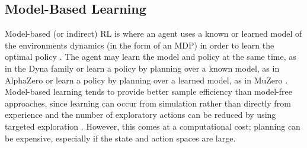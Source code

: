\subsection{Model-Based Learning}
Model-based (or indirect) RL is where an agent uses a known or learned model of the environments dynamics (in the form of an MDP) in order to learn the optimal policy \citep{MAL-086, RLSOTA11}. The agent may learn the model and policy at the same time, as in the Dyna family \citep{Sutton:1990, 10.1145/122344.122377} or learn a policy by planning over a known model, as in AlphaZero \citep{DBLP:journals/corr/abs-1712-01815} or learn a policy by planning over a learned model, as in MuZero \citep{DBLP:journals/corr/abs-1911-08265}.
Model-based learning tends to provide better sample efficiency than model-free approaches, since learning can occur from simulation rather than directly from experience \citep{RLSOTA11} and the number of exploratory actions can be reduced by using targeted exploration \citep{Thrun-1992-15850}. However, this comes at a computational cost; planning can be expensive, especially if the state and action spaces are large.
